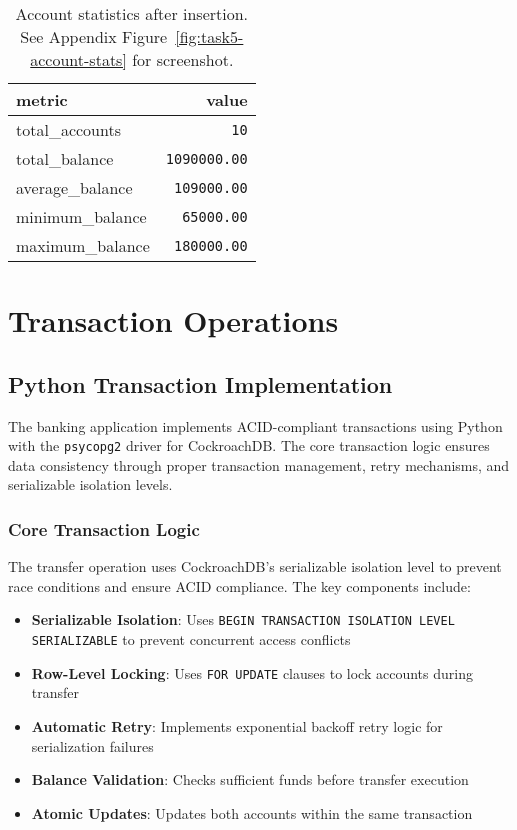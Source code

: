 \begin{table}[H]
  \centering
  \begin{tabular}{|l|r|}
    \hline
    \textbf{metric} & \textbf{value} \\
    \hline
    total\_accounts & \texttt{10} \\
    total\_balance & \texttt{1090000.00} \\
    average\_balance & \texttt{109000.00} \\
    minimum\_balance & \texttt{65000.00} \\
    maximum\_balance & \texttt{180000.00} \\
    \hline
  \end{tabular}
  \caption{Account statistics after insertion. See Appendix Figure~\ref{fig:task5-account-stats} for screenshot.}
\end{table}

\section{Transaction Operations}

\subsection{Python Transaction Implementation}
The banking application implements ACID-compliant transactions using Python with the \texttt{psycopg2} driver for CockroachDB. The core transaction logic ensures data consistency through proper transaction management, retry mechanisms, and serializable isolation levels.

\subsubsection{Core Transaction Logic}
The transfer operation uses CockroachDB's serializable isolation level to prevent race conditions and ensure ACID compliance. The key components include:

\begin{itemize}
    \item \textbf{Serializable Isolation}: Uses \texttt{BEGIN TRANSACTION ISOLATION LEVEL SERIALIZABLE} to prevent concurrent access conflicts
    \item \textbf{Row-Level Locking}: Uses \texttt{FOR UPDATE} clauses to lock accounts during transfer
    \item \textbf{Automatic Retry}: Implements exponential backoff retry logic for serialization failures
    \item \textbf{Balance Validation}: Checks sufficient funds before transfer execution
    \item \textbf{Atomic Updates}: Updates both accounts within the same transaction
\end{itemize}

